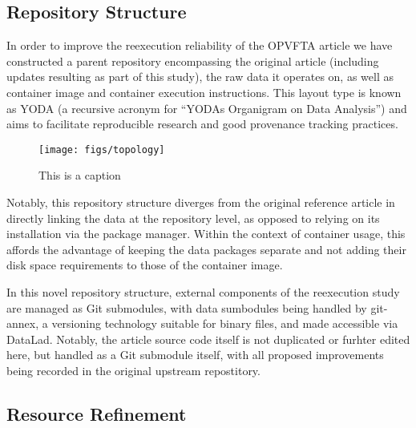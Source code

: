 \subsection{Repository Structure}
In order to improve the reexecution reliability of the OPVFTA article we have constructed a parent repository encompassing the original article (including updates resulting as part of this study), the raw data it operates on, as well as container image and container execution instructions.
This layout type is known as YODA (a recursive acronym for “YODAs Organigram on Data Analysis”) and aims to facilitate reproducible research and good provenance tracking practices.



\begin{figure}
	\centering
	\texttt{[image: figs/topology]}
	\caption{
		This is a caption
	}
	\label{fig:topology}
\end{figure}

Notably, this repository structure diverges from the original reference article in directly linking the data at the repository level, as opposed to relying on its installation via the package manager.
Within the context of container usage, this affords the advantage of keeping the data packages separate and not adding their disk space requirements to those of the container image.

In this novel repository structure, external components of the reexecution study are managed as Git submodules, with data sumbodules being handled by git-annex, a versioning technology suitable for binary files, and made accessible via DataLad.
Notably, the article source code itself is not duplicated or furhter edited here, but handled as a Git submodule itself, with all proposed improvements being recorded in the original upstream repostitory.


\subsection{Resource Refinement}

